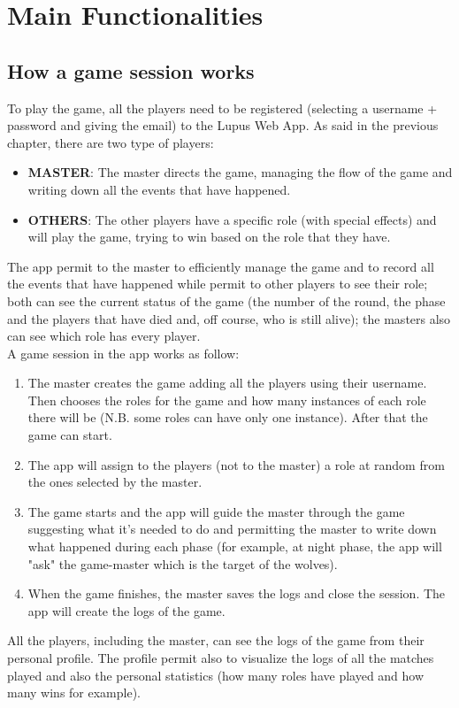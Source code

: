 \section{Main Functionalities}

\subsection{How a game session works}
To play the game, all the players need to be registered (selecting a username + password and giving the email) to the Lupus Web App. As said in the previous chapter, there are two type of players:
\begin{itemize}
    \item \textbf{MASTER}: The master directs the game, managing the flow of the game and writing down all the events that have happened.
    \item \textbf{OTHERS}: The other players have a specific role (with special effects) and will play the game, trying to win based on the role that they have. 
\end{itemize}
The app permit to the master to efficiently manage the game and to record all the events that have happened while permit to other players to see their role; both can see the current status of the game (the number of the round, the phase and the players that have died and, off course, who is still alive); the masters also can see which role has every player.
\\
A game session in the app works as follow:
\begin{enumerate}
    \item The master creates the game adding all the players using their username. Then chooses the roles for the game and how many instances of each role there will be (N.B. some roles can have only one instance). After that the game can start.
    \item The app will assign to the players (not to the master) a role at random from the ones selected by the master.
    \item The game starts and the app will guide the master through the game suggesting what it's needed to do and permitting the master to write down what happened during each phase (for example, at night phase, the app will "ask" the game-master which is the target of the wolves).
    \item When the game finishes, the master saves the logs and close the session. The app will create the logs of the game.
\end{enumerate}
All the players, including the master, can see the logs of the game from their personal profile. The profile permit also to visualize the logs of all the matches played and also the personal statistics (how many roles have played and how many wins for example).


